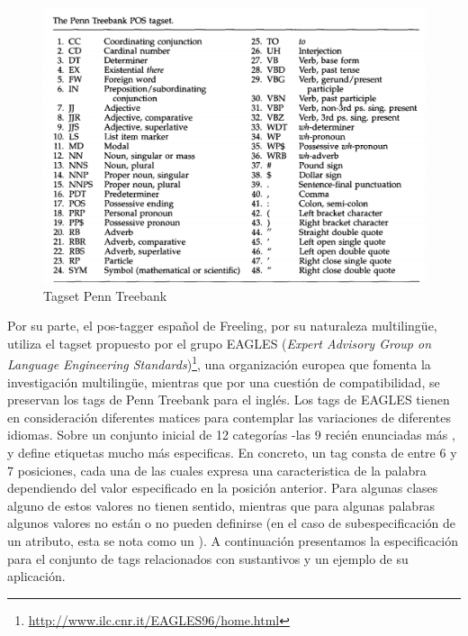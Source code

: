 \begin{figure}[H]
  \centering
    \includegraphics[scale=0.3]{graficos/penn-tagset}
  \caption{Tagset Penn Treebank}
  \label{fig:tagset-penn}
\end{figure}


Por su parte, el pos-tagger español de Freeling, por su naturaleza multilingüe, utiliza el tagset propuesto por el grupo EAGLES (\textit{Expert Advisory Group on Language Engineering Standards})\footnote{\url{http://www.ilc.cnr.it/EAGLES96/home.html}}, una organización europea que fomenta la investigación multilingüe, mientras que por una cuestión de compatibilidad, se preservan los tags de Penn Treebank para el inglés. Los tags de EAGLES tienen en consideración diferentes matices para contemplar las variaciones de diferentes idiomas. Sobre un conjunto inicial de 12 categorías -las 9 recién enunciadas más ,  y  define etiquetas mucho más especificas. En concreto, un tag consta de entre 6 y 7  posiciones, cada una de las cuales expresa una caracteristica de la palabra dependiendo del valor especificado en la posición anterior. Para algunas clases alguno de estos valores no tienen sentido, mientras que para algunas palabras algunos valores no están o no pueden definirse (en el caso de subespecificación de un atributo, esta se nota como un ). 
A continuación presentamos la especificación para el conjunto de tags relacionados con sustantivos y un ejemplo de su aplicación.

